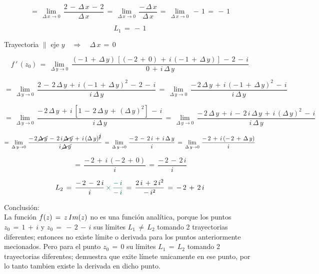 \documentclass[a4paper,11pt,openany]{book}
\begin{document}
$$=\,\displaystyle\lim_{\Delta\,x \to 0}\,\dfrac{2\,-\,\Delta\,x\,-\,2}{\Delta\,x}\,=\,\displaystyle\lim_{\Delta\,x \to 0}\,\dfrac{-\,\Delta\,x}{\Delta\,x}\,=\,\displaystyle\lim_{\Delta\,x \to 0}\,-\,1\,=\,-\,1$$

$$L_{1}\,=\,-\,1$$

\textcolor{ao(english)}{} Trayectoria $\parallel$ eje $y \quad\Rightarrow\quad \Delta\,x\,=\,0$

$$f\,'\,(z_{0})\,=\,\displaystyle\lim_{\Delta\,y \to 0}\,\dfrac{(-\,1\,+\,\Delta\,y)\,\left[(-\,2\,+\,0)\,+\,i\,(-\,1\,+\,\Delta\,y)\right]\,-\,2\,-\,i}{0\,+\,i\,\Delta\,y}$$

$$=\,\displaystyle\lim_{\Delta\,y \to 0}\,\dfrac{2\,-\,2\,\Delta\,y\,+\,i\,(-\,1\,+\,\Delta\,y)^{2}\,-\,2\,-\,i}{i\,\Delta\,y}\,=\,\displaystyle\lim_{\Delta\,y \to 0}\,\dfrac{-\,2\,\Delta\,y\,+\,i\,(-\,1\,+\,\Delta\,y)^{2}\,-\,i}{i\,\Delta\,y}$$

$$=\,\displaystyle\lim_{\Delta\,y \to 0}\,\dfrac{-\,2\,\Delta\,y\,+\,i\,[1\,-\,2\,\Delta\,y\,+\,(\Delta\,y)^{2}]\,-\,i}{i\,\Delta\,y}\,=\,\displaystyle\lim_{\Delta\,y \to 0}\,\dfrac{-\,2\,\Delta\,y\,+\,i\,-\,2\,i\,\Delta\,y\,+\,i\,(\Delta\,y)^{2}\,-\,i}{i\,\Delta\,y}$$

$$=\,\displaystyle\lim_{\Delta\,y \to 0}\,\dfrac{-\,2\,\cancel{\Delta\,y}\,-\,2\,i\,\cancel{\Delta\,y}\,+\,i\,(\Delta\,y)^{\cancel{2}}}{i\,\cancel{\Delta\,y}}\,=\,\displaystyle\lim_{\Delta\,y \to 0}\,\dfrac{-\,2\,-\,2\,i\,+\,i\,\Delta\,y}{i}\,=\,\displaystyle\lim_{\Delta\,y \to 0}\,\dfrac{-\,2\,+\,i\,(-\,2\,+\,\Delta\,y)}{i}$$

$$=\,\dfrac{-\,2\,+\,i\,(-\,2\,+\,0)}{i}\,=\,\dfrac{-\,2\,-\,2\,i}{i}$$

$$L_{2}\,=\,\dfrac{-\,2\,-\,2\,i}{i}\,\textcolor{cadmiumgreen}{\times\,\dfrac{-\,i}{-\,i}}\,=\,\dfrac{2\,i\,+\,2\,i^{2}}{-\,i^{2}}\,=\,-\,2\,+\,2\,i$$

\textcolor{ao(english)}{} Conclusión:\\

La función $f(z)\,=\,z\,\mathnormal{Im}(z)$ no es una función analítica, porque los puntos $z_{0}\,=\,1\,+\,i$ y $z_{0}\,=\,-\,2\,-\,i$ sus límites $L_{1}\,\neq\,L_{2}$ tomando 2 trayectorias diferentes; entonces no existe límite o derivada para los puntos anteriormente mecionados. Pero para el punto $z_{0}\,=\,0$ su límites $L_{1}\,=\,L_{2}$ tomando 2 trayectorias diferentes; demuestra que exite límete unicamente en ese punto, por lo tanto tambien existe la derivada en dicho punto.\\
\end{document}
